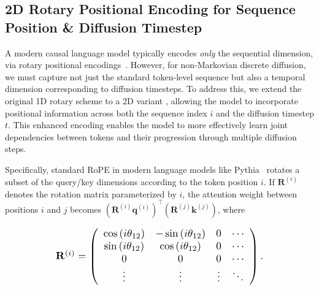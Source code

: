 \subsection{2D Rotary Positional Encoding for Sequence Position \& Diffusion Timestep}
\label{subsec:2d_rotary}

A modern causal language model typically encodes \textit{only} the sequential dimension, via rotary positional encodings~\citep{roformer}. However, for non-Markovian discrete diffusion, we must capture not just the standard token-level sequence but also a temporal dimension corresponding to diffusion timesteps. To address this, we extend the original 1D rotary scheme to a {2D} variant 
, allowing the model to incorporate positional information across both the sequence index \(i\) and the diffusion timestep \(t\). This enhanced encoding enables the model to more effectively learn joint dependencies between tokens and their progression through multiple diffusion steps.



Specifically, standard RoPE in modern language models like Pythia~\citep{biderman2023pythia} rotates a subset
of the query/key dimensions according to the token position $i$. If $\mathbf{R}^{(i)}$ denotes the rotation matrix parameterized by $i$, the attention weight between positions $i$ and $j$ becomes $\left(\mathbf{R}^{(i)} \mathbf{q}^{(i)}\right)^{\top}\left(\mathbf{R}^{(j)} \mathbf{k}^{(j)}\right)$, where

\begin{equation*}
\label{eq:1d_rotary}
\resizebox{.70\columnwidth}{!}{$
\mathbf{R}^{(i)}=\left(\begin{array}{ccccc}
\cos \left(i \theta_{12}\right) & -\sin \left(i \theta_{12}\right) & 0 & \cdots \\
\sin \left(i \theta_{12}\right) & \cos \left(i \theta_{12}\right) & 0 & \cdots \\
0 & 0 & 0 & \cdots\\
\vdots & \vdots &  \vdots & \ddots
\end{array}\right).
$}
\end{equation*}

